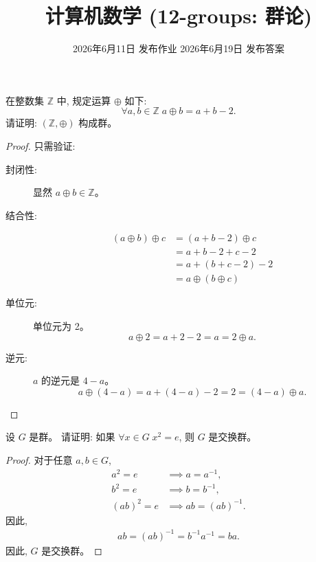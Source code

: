 \documentclass[a4paper, justified]{tufte-handout}
\title{计算机数学 (12-groups: 群论)}
\date{2026年6月11日 发布作业 \qquad 2026年6月19日 发布答案}
\begin{document}
\maketitle
\noplagiarism %
\begin{abstract}
\end{abstract}
\beginrequired

\begin{problem}
  在整数集 $\mathbb{Z}$ 中, 规定运算 $\oplus$ 如下:
  \[
    \forall a, b \in \mathbb{Z}\; a \oplus b = a + b - 2.
  \]
  请证明: $(\mathbb{Z}, \oplus)$ 构成群。
\end{problem}

\begin{proof}
  只需验证:
  \begin{description}
    \item[封闭性:] 显然 $a \oplus b \in \mathbb{Z}$。
    \item[结合性:]
      \begin{align*}
        (a \oplus b) \oplus c &= (a + b - 2) \oplus c \\
          &= a + b - 2 + c - 2 \\
          &= a + (b + c - 2) - 2 \\
          &= a \oplus (b \oplus c)
      \end{align*}
    \item[单位元:] 单位元为 2。
      \[
        a \oplus 2 = a + 2 - 2 = a = 2 \oplus a.
      \]
    \item[逆元:] $a$ 的逆元是 $4-a$。
      \[
        a \oplus (4 - a) = a + (4 - a) - 2 = 2 = (4 - a) \oplus a.
      \]
  \end{description}
\end{proof}

\begin{problem}
  设 $G$ 是群。
  请证明: 如果 $\forall x \in G\; x^2 = e$,
  则 $G$ 是交换群。
\end{problem}

\begin{proof}
  对于任意 $a, b \in G$,
  \begin{align*}
    a^{2} = e &\implies a = a^{-1}, \\
    b^{2} = e &\implies b = b^{-1}, \\
    (ab)^{2} = e &\implies ab = (ab)^{-1}.
  \end{align*}
  因此,
  \begin{align*}
    ab = (ab)^{-1} = b^{-1} a^{-1} = ba.
  \end{align*}
  因此, $G$ 是交换群。
\end{proof}
\end{document}
